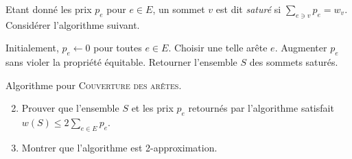 \documentclass[12pt]{article}
\begin{document}
 Etant donné les prix $p_{e}$ pour $e \in E$, 
		un sommet $v$ est dit \emph{saturé} si $\sum_{e\ni v} p_{e} = w_{v}$.
		Considérer l'algorithme suivant.
		
\begin{algorithm}[ht]
\begin{algorithmic}[1]  
\STATE Initialement, $p_{e} \gets 0$ pour toutes $e \in E$. 
	\STATE Choisir une telle arête $e$.
	\STATE Augmenter $p_{e}$ sans violer la propriété équitable.
\ENDWHILE
\STATE Retourner l'ensemble $S$ des sommets saturés.
\end{algorithmic}
\caption{Algorithme pour \textsc{Couverture des arêtes}.}
\label{algo:covering}
\end{algorithm}

\begin{enumerate}
	\setcounter{enumi}{1}
	\item Prouver que l'ensemble $S$ et les prix $p_{e}$ retournés par l'algorithme satisfait $w(S) \leq 2 \sum_{e \in E} p_{e}$.
	\item Montrer que l'algorithme est 2-approximation.
\end{enumerate}
\end{document}
